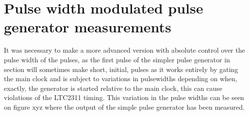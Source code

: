 \chapter{Pulse width modulated pulse generator measurements} \label{App:PWMGenTests}
It was necessary to make a more advanced version with absolute control over the pulse width of the pulses, as the first pulse of the simpler pulse generator in section  will sometimes make short, initial, pulses as it works entirely by gating the main clock and is subject to variations in pulsewidths depending on when, exactly, the generator is started relative to the main clock, this can cause violations of the LTC2311 timing. This variation in the pulse widths can be seen on figure xyz where the output of the simple pulse generator has been measured.
